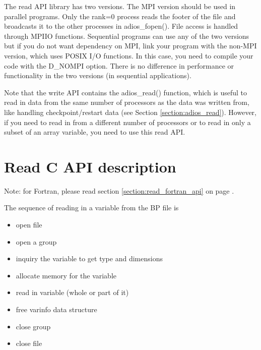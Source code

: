 The read API library has two versions. The MPI version should be used in parallel 
programs. Only the rank=0 process reads the footer of the file and broadcasts it 
to the other processes in adios\_fopen(). File access is handled through MPI\-{}IO 
functions. Sequential programs can use any of the two versions but if you do not 
want dependency on MPI, link your program with the non-MPI version, which uses 
POSIX I/O functions. In this case, you need to compile your code with the \-{}D\_NOMPI 
option. There is no difference in performance or functionality in the two versions 
(in sequential applications). 

Note that the write API contains the adios\_read() function, which is useful to 
read in data from the same number of processors as the data was written from, like 
handling checkpoint/restart data (see Section \ref{section:adios_read}). However, if you need to 
read in from a different number of processors or to read in only a subset of an 
array variable, you need to use this read API.

\section{Read C API description}

Note: for Fortran, please read section \ref{section:read_fortran_api} on page \pageref{section:read_fortran_api}.

The sequence of reading in a variable from the BP file is

\begin{itemize}
\renewcommand{\labelitemi}{$-$}
\item open file

\item open a group

\item inquiry the variable to get type and dimensions

\item allocate memory for the variable

\item read in variable (whole or part of it)

\item free varinfo data structure

\item close group

\item close file
\end{itemize}

